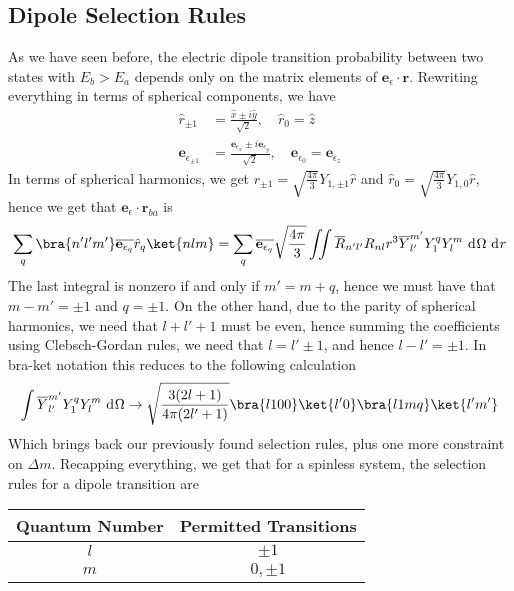 \documentclass[a4paper, 11pt]{book}
\renewcommand{\vec}[1]{\mathbf{#1}}
\newcommand{\ver}[1]{\vec{e}_{#1}}
\newcommand{\1}{\opr{\mathds{1}}}
\newcommand{\diff}[2][]{\ \mathrm{d}^{#1}#2}
\newcommand{\opr}[1]{\hat{#1}}
\newcommand{\cc}[1]{\overline{#1}}
\theoremstyle{plain}
\begin{document}
	\subsection{Dipole Selection Rules}
	As we have seen before, the electric dipole transition probability between two states with $E_b>E_a$ depends only on the matrix elements of $\ver{\epsilon}\cdot\vec{r}$. Rewriting everything in terms of spherical components, we have
	\begin{equation}
		\begin{aligned}
			\opr{r}_{\pm1}&=\frac{\opr{x}\pm i\opr{y}}{\sqrt{2}},\quad\opr{r}_0=\opr{z}\\
			\ver{\epsilon_{\pm1}}&=\frac{\ver{\epsilon_x}\pm i\ver{\epsilon_y}}{\sqrt{2}},\quad\ver{\epsilon_0}=\ver{\epsilon_z}
		\end{aligned}
		\label{eq:sphcoord}
	\end{equation}
	In terms of spherical harmonics, we get $r_{\pm1}=\sqrt{\frac{4\pi}{3}}Y_{1,\pm1}\opr{r}$ and $\opr{r}_0=\sqrt{\frac{4\pi}{3}}Y_{1,0}\opr{r}$, hence we get that $\ver{\epsilon}\cdot\vec{r}_{ba}$ is
	\begin{equation}
		\sum_q\bra{n'l'm'}\cc{\ver{\epsilon_q}}\opr{r}_q\ket{nlm}=\sum_q\cc{\ver{\epsilon_q}}\sqrt{\frac{4\pi}{3}}\iint\cc{R}_{n'l'}R_{nl}r^3\cc{Y}^{m'}_{l'}Y_{1}^qY^m_l\diff{\Omega}\diff{r}
		\label{eq:selrulesdippolarization}
	\end{equation}
	The last integral is nonzero if and only if $m'=m+q$, hence we must have that $m-m'=\pm1$ and $q=\pm1$. On the other hand, due to the parity of spherical harmonics, we need that $l+l'+1$ must be even, hence summing the coefficients using Clebsch-Gordan rules, we need that $l=l'\pm1$, and hence $l-l'=\pm1$. In bra-ket notation this reduces to the following calculation
	\begin{equation}
		\int\cc{Y}_{l'}^{m'}Y^q_1Y^m_l\diff{\Omega}\to\sqrt{\frac{3(2l+1)}{4\pi(2l'+1)}}\bra{l100}\ket{l'0}\bra{l1mq}\ket{l'm'}
		\label{eq:cgtableselrule}
	\end{equation}
	Which brings back our previously found selection rules, plus one more constraint on $\Delta m$. Recapping everything, we get that for a spinless system, the selection rules for a dipole transition are
	\begin{table}[H]
		\centering
		\begin{tabular}{|c|c|}
			\hline
			Quantum Number&Permitted Transitions\\
			\hline
			$l$&$\pm1$\\
			\hline
			$m$&$0,\pm1$\\
			\hline
		\end{tabular}
		\label{tab:selectionrulesspinless}
	\end{table}
\end{document}
